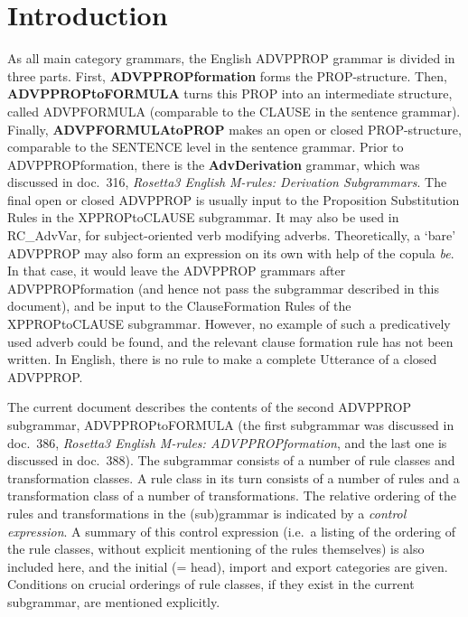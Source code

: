 
   \RosDate{\today}
   \RosSupersedes{-}
   \MakeRosTitle
%
%

\section{Introduction}
As all main category grammars, the English ADVPPROP grammar is divided in 
three parts. First, {\bf ADVPPROPformation} forms the PROP-structure. Then, {
\bf ADVP\-PROPtoFORMULA} turns this PROP into an intermediate structure, called 
ADVPFORMULA
(comparable to the CLAUSE in the sentence grammar). Finally, {\bf 
ADVPFORMULAtoPROP} makes an open or closed PROP-structure, comparable to the 
SENTENCE level in the sentence grammar. Prior to ADVPPROPformation, there is 
the {\bf AdvDerivation} grammar, which was discussed in doc.\ 316, {\em 
Rosetta3 English M-rules: Derivation Subgrammars\/}. The final open or closed 
ADVPPROP is usually input to the Proposition Substitution Rules in the 
XPPROPtoCLAUSE subgrammar. It may also be used in RC\_AdvVar, 
for subject-oriented 
verb modifying adverbs. Theoretically, a `bare' ADVPPROP may also form an 
expression on 
its own with help of the copula {\em be\/}. In that case, it would leave the 
ADVPPROP grammars after ADVPPROPformation (and hence not pass the subgrammar 
described in this document), and 
be input to the ClauseFormation Rules of the XPPROPtoCLAUSE subgrammar. 
However, no example of such a predicatively used adverb could be found, 
and the relevant clause formation rule has not been written.
In English, there is no rule to make a complete Utterance of a closed ADVPPROP.

The current document describes the contents of the second ADVPPROP subgrammar, 
ADVPPROPtoFORMULA (the first subgrammar was discussed in doc.\ 386, {\em 
Rosetta3 English M-rules: ADVPPROPformation\/}, and the last one is discussed 
in doc.\ 388). The subgrammar consists of 
a number of rule classes and transformation classes. A rule class in its turn
consists of a number of rules and a transformation class of a number of 
transformations. The relative ordering of the rules and transformations in the
(sub)grammar is indicated by a {\em control expression}. A summary of this
control expression (i.e.\ a listing of the ordering of the rule classes, 
without explicit mentioning of the rules themselves) is also included here, 
and the initial (= head), import and export categories are given. Conditions on 
crucial orderings of rule classes, if they exist in the current subgrammar, are 
mentioned explicitly.

